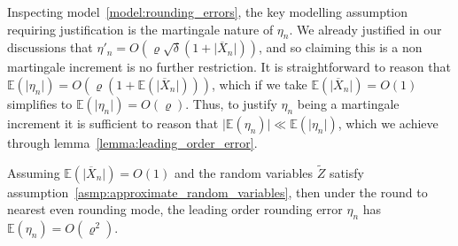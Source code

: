 \documentclass[manuscript,review]{acmart}
\begin{document}
Inspecting model~\ref{model:rounding_errors}, the key modelling assumption requiring justification is the martingale nature of $ \eta_n $. We already justified in our discussions that $ \eta'_n = O(\varrho\sqrt{\delta} (1 + \lvert \overline{X}_n\rvert)) $, and so claiming this is a non martingale increment is no further restriction. It is straightforward to reason that $ \mathbb{E}(\lvert \eta_n\rvert) = O(\varrho (1 + \mathbb{E}(\lvert\overline{X}_n\rvert))) $, which if we take $ \mathbb{E}(\lvert \overline{X}_n\rvert ) = O(1) $ simplifies to $ \mathbb{E}(\lvert \eta_n\rvert ) = O(\varrho) $. Thus, to justify $ \eta_n $ being a martingale increment it is sufficient to reason that $ \lvert \mathbb{E}(\eta_n)\rvert \ll \mathbb{E}(\lvert \eta_n\rvert )$, which we achieve through lemma~\ref{lemma:leading_order_error}.

\begin{lemma}
\label{lemma:leading_order_error}
Assuming $ \mathbb{E}(\lvert \overline{X}_n\rvert ) = O(1) $ and the random variables $ \widetilde{Z} $ satisfy assumption~\ref{asmp:approximate_random_variables}, then under the round to nearest even rounding mode, the leading order rounding error $ \eta_n $ has $ \mathbb{E}(\eta_n) = O(\varrho^2) $.
\end{lemma}
\end{document}
